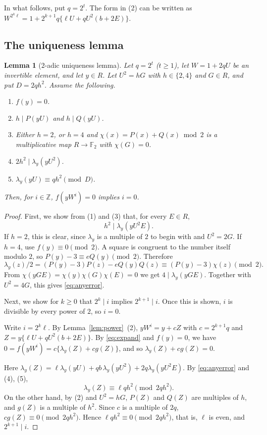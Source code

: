 \documentclass[a4paper,11pt]{article}
\theoremstyle{plain}
\newtheorem{lemma}[theorem]{Lemma}
\theoremstyle{definition}
\theoremstyle{remark}
\numberwithin{equation}{section}
\numberwithin{table}{section}
\newcommand{\Z}{\mathbb{Z}}
\newcommand{\F}{\mathbb{F}}
\begin{document}
In what follows, put $q=2^t$. The form in (2) can be written as $W^{2^k\ell}=1+2^{k+1}q\{\ell U+qU^2(b+2E)\}$.

\subsection{The uniqueness lemma}

\begin{lemma}[$2$-adic uniqueness lemma]\label{lem:unique}
Let $q=2^t$ ($t\ge1$), let $W=1+2qU$ be an invertible element, and let $y\in R$.
Let $U^2=hG$ with $h\in\{2,4\}$ and $G\in R$, and put $D=2qh^2$. Assume the following.
\begin{enumerate}
\item $f(y)=0$.
\item $h\mid P(yU)$ and $h\mid Q(yU)$.
\item Either $h=2$, or $h=4$ and $\chi(x)=P(x)+Q(x)\bmod2$ is a multiplicative map $R\to\F_2$ with $\chi(G)=0$.
\item $2h^2\mid\lambda_y(yU^2)$.
\item $\lambda_y(yU)\equiv qh^2\pmod D$.
\end{enumerate}
Then, for $i\in\Z$, $f(yW^i)=0$ implies $i=0$.
\end{lemma}

\begin{proof}
First, we show from (1) and (3) that, for every $E\in R$,
\begin{equation}\label{eq:anyerror}
h^2\mid\lambda_y(yU^2E).
\end{equation}
If $h=2$, this is clear, since $\lambda_y$ is a multiple of $2$ to begin with and $U^2=2G$.
If $h=4$, use $f(y)\equiv0\pmod2$. A square is congruent to the number itself modulo $2$, so $P(y)-3\equiv eQ(y)\pmod2$. Therefore
\[
\lambda_y(z)/2=(P(y)-3)P(z)-eQ(y)Q(z)\equiv(P(y)-3)\chi(z)\pmod2.
\]
From $\chi(yGE)=\chi(y)\chi(G)\chi(E)=0$ we get $4\mid\lambda_y(yGE)$. Together with $U^2=4G$, this gives \eqref{eq:anyerror}.

Next, we show for $k\ge0$ that $2^k\mid i$ implies $2^{k+1}\mid i$.
Once this is shown, $i$ is divisible by every power of $2$, so $i=0$.

Write $i=2^k\ell$. By Lemma~\ref{lem:power}~(2), $yW^i=y+cZ$ with $c=2^{k+1}q$ and $Z=y\{\ell U+qU^2(b+2E)\}$.
By \eqref{eq:expand} and $f(y)=0$, we have $0=f(yW^i)=c\{\lambda_y(Z)+cg(Z)\}$, and so $\lambda_y(Z)+cg(Z)=0$.

Here $\lambda_y(Z)=\ell\lambda_y(yU)+qb\,\lambda_y(yU^2)+2q\lambda_y(yU^2E)$.
By \eqref{eq:anyerror} and (4), (5),
\[
\lambda_y(Z)\equiv\ell qh^2\pmod{2qh^2}.
\]
On the other hand, by (2) and $U^2=hG$, $P(Z)$ and $Q(Z)$ are multiples of $h$, and $g(Z)$ is a multiple of $h^2$. Since $c$ is a multiple of $2q$, $cg(Z)\equiv0\pmod{2qh^2}$.
Hence $\ell qh^2\equiv0\pmod{2qh^2}$, that is, $\ell$ is even, and $2^{k+1}\mid i$.
\end{proof}
\end{document}
